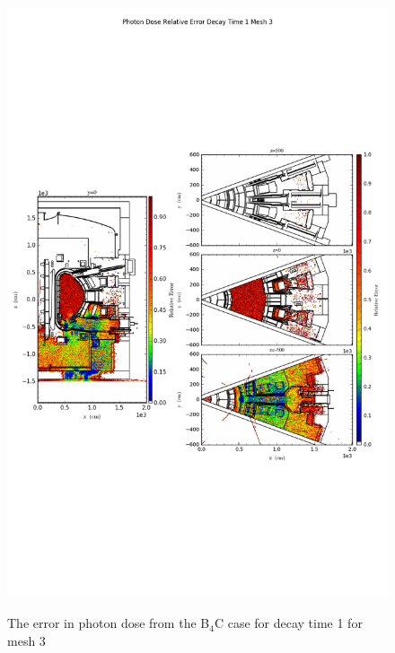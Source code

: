 \begin{figure}[ht!]
\centering
\includegraphics[trim={0cm 9cm 0cm 10cm},clip,scale=0.75]{../plots/final_model_with_b4c/Photon_Dose_Relative_Error_Decay_Time_1_Mesh_3.png}
\label{fig:photons_dc1_no4bc_m3_error}
\caption{The error in photon dose from the B$_4$C case for decay time 1 for mesh 3}
\end{figure}
